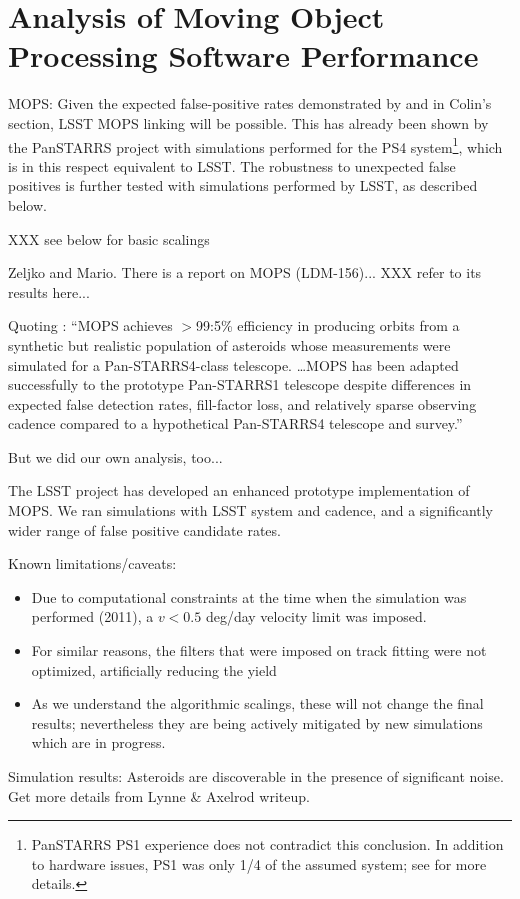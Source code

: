 
\section{Analysis of Moving Object Processing Software Performance \label{sec:mops}}


MOPS: Given the expected false-positive rates demonstrated by
\cite{goldstein15} and in Colin's  section, LSST MOPS linking will
be possible. This has already been shown by the PanSTARRS project 
with simulations performed for the PS4 system\footnote{PanSTARRS 
PS1 experience does not contradict this conclusion. In addition to 
hardware issues, PS1 was only 1/4 of the assumed system; see 
\cite{denneau13} for more details. }, which is in this
respect equivalent to LSST. The robustness to unexpected false
positives is further tested with simulations performed by LSST,
as described below. 
   




XXX see below for basic scalings 

Zeljko and Mario. There is a report on MOPS (LDM-156)...   XXX refer to its
results here... 

Quoting \cite{denneau13}: ``MOPS achieves $>$99:5\% efficiency in
producing orbits from a synthetic
but realistic population of asteroids whose measurements were
simulated for a Pan-STARRS4-class telescope. \dots MOPS has been
adapted successfully to the prototype Pan-STARRS1 telescope despite
differences in expected false detection rates, fill-factor loss, and
relatively sparse observing cadence compared to a hypothetical
Pan-STARRS4 telescope and survey.'' 

But we did our own analysis, too...

The LSST project has developed an enhanced prototype implementation of MOPS.
We ran simulations with LSST system and cadence, and a significantly
wider range of false positive candidate rates. 

Known limitations/caveats:
\begin{itemize}
\item Due to computational constraints at the time when the simulation
  was performed (2011), a $v < 0.5$ deg/day velocity limit was
  imposed.
\item For similar reasons, the filters that were imposed on track fitting
  were not optimized, artificially reducing the yield
\item As we understand the algorithmic scalings, these will not change the
final results; nevertheless they are being actively mitigated by new
simulations which are in progress.
\end{itemize}

Simulation results: Asteroids are discoverable in the presence of significant noise.
Get more details from Lynne \& Axelrod writeup. 

